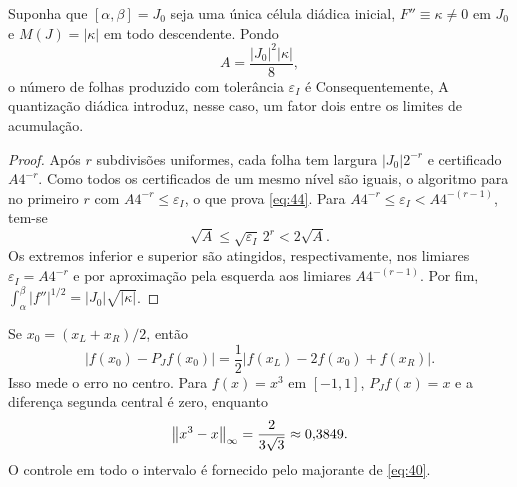 \begin{proposicao}
Suponha que $[\alpha,\beta]=J_0$ seja uma única célula diádica inicial, $F''\equiv\kappa\ne0$ em $J_0$ e $M(J)=|\kappa|$ em todo descendente. Pondo
\[
A=\frac{|J_0|^2|\kappa|}8,
\]
o número de folhas produzido com tolerância $\varepsilon_I$ é
Consequentemente,
A quantização diádica introduz, nesse caso, um fator dois entre os limites de acumulação.
\end{proposicao}
\begin{proof}
Após $r$ subdivisões uniformes, cada folha tem largura $|J_0|2^{-r}$ e certificado $A4^{-r}$. Como todos os certificados de um mesmo nível são iguais, o algoritmo para no primeiro $r$ com $A4^{-r}\le\varepsilon_I$, o que prova \eqref{eq:44}. Para $A4^{-r}\le\varepsilon_I<A4^{-(r-1)}$, tem-se
\[
\sqrt A\le\sqrt{\varepsilon_I}\,2^r<2\sqrt A.
\]
Os extremos inferior e superior são atingidos, respectivamente, nos limiares $\varepsilon_I=A4^{-r}$ e por aproximação pela esquerda aos limiares $A4^{-(r-1)}$. Por fim, $\int_\alpha^\beta|f''|^{1/2}=|J_0|\sqrt{|\kappa|}$.
\end{proof}

\begin{observacao}
Se $x_0=(x_L+x_R)/2$, então
\[
|f(x_0)-P_Jf(x_0)|=\frac12|f(x_L)-2f(x_0)+f(x_R)|.
\]
Isso mede o erro no centro. Para $f(x)=x^3$ em $[-1,1]$, $P_Jf(x)=x$ e a diferença segunda central é zero, enquanto
\[
\left\|x^3-x\right\|_{\infty}=\frac2{3\sqrt3}\approx0{,}3849.
\]
O controle em todo o intervalo é fornecido pelo majorante de \eqref{eq:40}.
\end{observacao}
